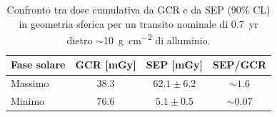\documentclass[a4paper,12pt]{article}
\begin{document}
\begin{table}[h]
\centering
\begin{tabular}{lccc}
\hline\hline
Fase solare & GCR [mGy] & SEP [mGy] & SEP/GCR \\
\hline
Massimo & $38.3$ & $62.1 \pm 6.2$ & $\sim 1.6$ \\
Minimo  & $76.6$ & $5.1 \pm 0.5$  & $\sim 0.07$ \\
\hline\hline
\end{tabular}
\caption{Confronto tra dose cumulativa da GCR e da SEP (90\% CL) in geometria sferica per un transito nominale di \SI{0.7}{yr} dietro $\sim$\SI{10}{\gram\per\centi\metre\squared} di alluminio.}
\label{tab:confronto_sep_gcr}
\end{table}
\end{document}
